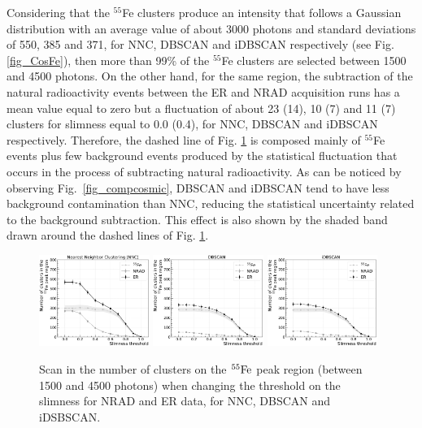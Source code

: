 \documentclass[a4paper,11pt]{article}
\begin{document}
Considering that the $^{55}$Fe clusters produce an intensity that follows a Gaussian distribution with an average value of about 3000 photons and standard deviations of 550, 385 and 371, for NNC, DBSCAN and iDBSCAN respectively (see Fig. \ref{fig_CosFe}), then more than 99\% of the $^{55}$Fe clusters are selected between 1500 and 4500 photons.
On the other hand, for the same region, the subtraction of the natural radioactivity events between the ER and NRAD acquisition runs has a mean value equal to zero but a fluctuation of about 23 (14), 10 (7) and 11 (7) clusters for slimness equal to 0.0 (0.4), for NNC, DBSCAN and iDBSCAN respectively. Therefore, the dashed line of Fig. \ref{fig_slim_scan} is composed mainly of $^{55}$Fe events plus few background events produced by the statistical fluctuation that occurs in the process of subtracting natural radioactivity.
As can be noticed by observing Fig.~\ref{fig_compcosmic}, DBSCAN and iDBSCAN tend to have less background contamination than NNC, reducing the statistical uncertainty related to the background subtraction. This effect is also shown by the shaded band drawn around the dashed lines of Fig. \ref{fig_slim_scan}.

\begin{figure}[ht]
\centering
\includegraphics[width=0.32\textwidth]{NNC_ScanSlim.pdf}
\includegraphics[width=0.32\textwidth]{DBSCAN_Scanslim.pdf}
\includegraphics[width=0.32\textwidth]{I2DBSCAN_Scanslim.pdf}
\caption{Scan in the number of clusters on the $\rm ^{55}Fe$ peak region (between 1500 and 4500 photons) when changing the threshold on the slimness for NRAD and ER data, for NNC, DBSCAN and iDSBSCAN.} 
\label{fig_slim_scan}
\end{figure}
\end{document}
